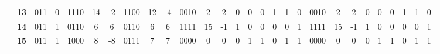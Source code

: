 \begin{figure}[H]
\begin{tcolorbox}[left=5mm,right=5mm,top=0mm,bottom=5mm,boxsep=0mm,
toptitle=0.5mm,bottomtitle=0.5mm,title=Resultados Teóricos \textit{versus} Resultados Experimentais,center title]
\begin{minipage}{\textwidth}
{\begin{tabular}{c|c|c|c|c|c|c|c|c|c|c|c|c|c|c|c|c|c|c|c|c|c|c|c|c|c|c|c|}
\cline{2-28}
                                                                                                           & \textbf{13}          & 011                  & 0                    & 1110                 & 14                                          & -2                                          & 1100                 & 12                                          & -4                                          & 0010                 & 2                                           & 2                                           & 0                    & 0                    & 0                    & 1                    & 1                    & 0                    & 0010                 & 2                                           & 2                                           & 0                    & 0                    & 0                    & 1                    & 1                    & 0                     \\ 
\cline{2-28}
                                                                                                           & \textbf{14}          & 011                  & 1                    & 0110                 & 6                                           & 6                                           & 0110                 & 6                                           & 6                                           & 1111                 & 15                                          & -1                                          & 1                    & 0                    & 0                    & 0                    & 0                    & 1                    & 1111                 & 15                                          & -1                                          & 1                    & 0                    & 0                    & 0                    & 0                    & 1                     \\ 
\cline{2-28}
                                                                                                           & \textbf{15}          & 011                  & 1                    & 1000                 & 8                                           & -8                                          & 0111                 & 7                                           & 7                                           & 0000                 & 0                                           & 0                                           & 0                    & 1                    & 1                    & 0                    & 1                    & 1                    & 0000                 & 0                                           & 0                                           & 0                    & 1                    & 1                    & 0                    & 1                    & 1                     \\ 

\end{tabular}}
\end{minipage}
\end{tcolorbox}
\end{figure}

